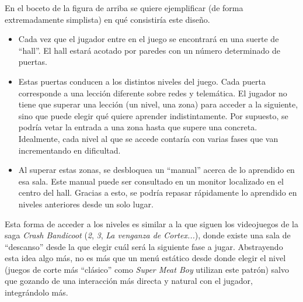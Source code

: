 En el boceto de la figura de arriba se quiere ejemplificar (de forma extremadamente simplista) en qué consistiría este diseño.
\begin{itemize}
\item Cada vez que el jugador entre en el juego se encontrará en una suerte de ``hall''. El hall estará acotado por paredes con un número determinado de puertas.
\item Estas puertas conducen a los distintos niveles del juego. Cada puerta corresponde a una lección diferente sobre redes y telemática. El jugador no tiene que superar una lección (un nivel, una zona) para acceder a la siguiente, sino que puede elegir qué quiere aprender indistintamente. Por supuesto, se podría vetar la entrada a una zona hasta que supere una concreta. Idealmente, cada nivel al que se accede contaría con varias fases que van incrementando en dificultad.
\item Al superar estas zonas, se desbloquea un ``manual'' acerca de lo aprendido en esa sala. Este manual puede ser consultado en un monitor localizado en el centro del hall. Gracias a esto, se podría repasar rápidamente lo aprendido en niveles anteriores desde un solo lugar.
\end{itemize}
Esta forma de acceder a los niveles es similar a la que siguen los videojuegos de la saga \textit{Crash Bandicoot} (\textit{2}, \textit{3}, \textit{La venganza de Cortex...}), donde existe una sala de ``descanso'' desde la que elegir cuál será la siguiente fase a jugar. Abstrayendo esta idea algo más, no es más que un menú estático desde donde elegir el nivel (juegos de corte más ``clásico'' como \textit{Super Meat Boy} utilizan este patrón) salvo que gozando de una interacción más directa y natural con el jugador, integrándolo más.


